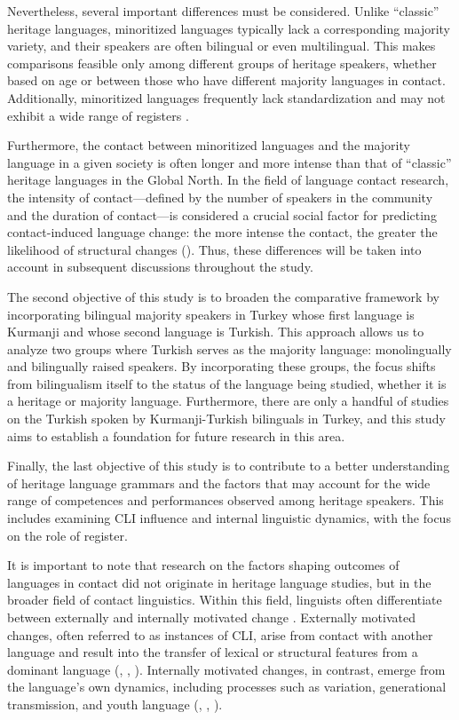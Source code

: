 Nevertheless, several important differences must be considered. Unlike “classic” heritage languages, minoritized languages typically lack a corresponding majority variety, and their speakers are often bilingual or even multilingual. This makes comparisons feasible only among different groups of heritage speakers, whether based on age or between those who have different majority languages in contact. Additionally, minoritized languages frequently lack standardization and may not exhibit a wide range of registers \citep[323-324]{Polinsky2018}.

Furthermore, the contact between minoritized languages and the majority language in a given society is often longer and more intense than that of “classic” heritage languages in the Global North. In the field of language contact research, the intensity of contact—defined by the number of speakers in the community and the duration of contact—is considered a crucial social factor for predicting contact-induced language change: the more intense the contact, the greater the likelihood of structural changes (\citealt{ThomasonKaufman1988}). Thus, these differences will be taken into account in subsequent discussions throughout the study.

The second objective of this study is to broaden the comparative framework by incorporating bilingual majority speakers in Turkey whose first language is Kurmanji and whose second language is Turkish. This approach allows us to analyze two groups where Turkish serves as the majority language: monolingually and bilingually raised speakers. By incorporating these groups, the focus shifts from bilingualism itself to the status of the language being studied, whether it is a heritage or majority language. Furthermore, there are only a handful of studies on the Turkish spoken by Kurmanji-Turkish bilinguals in Turkey, and this study aims to establish a foundation for future research in this area.

Finally, the last objective of this study is to contribute to a better understanding of heritage language grammars and the factors that may account for the wide range of competences and performances observed among heritage speakers. This includes examining CLI influence and internal linguistic dynamics, with the focus on the role of register.

It is important to note that research on the factors shaping outcomes of languages in contact did not originate in heritage language studies, but in the broader field of contact linguistics. Within this field, linguists often differentiate between externally and internally motivated change \citep{Hickey2020}. Externally motivated changes, often referred to as instances of CLI, arise from contact with another language and result into the transfer of lexical or structural features from a dominant language (\citealt{jarvis_crosslinguistic_2008}, \citealt{ThomasonKaufman1988}, \citealt{Matras2009, Matras2020}). Internally motivated changes, in contrast, emerge from the language's own dynamics, including processes such as variation, generational transmission, and youth language (\citealt{Labov1994, Labov2001, Labov2010}, \citealt{PoplackLevey2010}, \citealt{Tagliamonte2016}).

